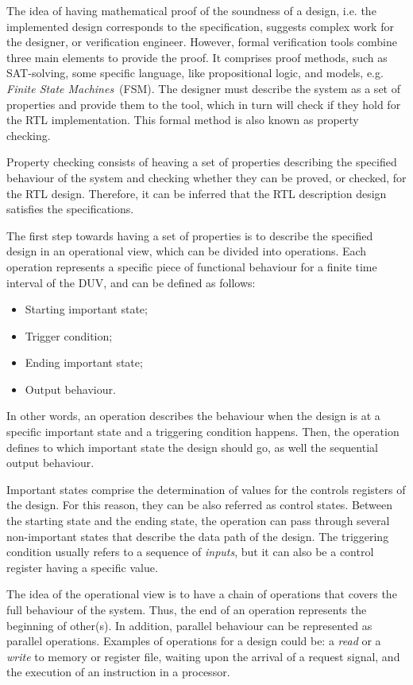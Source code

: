 The idea of having mathematical proof of the soundness of a design, i.e. the implemented design corresponds to the specification, suggests complex work for the designer, or verification engineer. However, formal verification tools combine three main elements to provide the proof. It comprises proof methods, such as SAT-solving, some specific language, like propositional logic, and models, e.g. \textit{Finite State Machines}~(FSM). The designer must describe the system as a set of properties and provide them to the tool, which in turn will check if they hold for the RTL implementation. This formal method is also known as property checking. 

Property checking consists of heaving a set of properties describing the specified behaviour of the system and checking whether they can be proved, or checked, for the RTL design.  Therefore, it can be inferred that the RTL description design satisfies the specifications. 

The first step towards having a set of properties is to describe the specified design in an operational view, which can be divided into operations. Each operation represents a specific piece of functional behaviour for a finite time interval of the DUV, and can be defined as follows:

\begin{itemize}
    \item Starting important state;
    \item Trigger condition;
    \item Ending important state;
    \item Output behaviour.
\end{itemize}

In other words, an operation describes the behaviour when the design is at a specific important state and a triggering condition happens. Then, the operation defines to which important state the design should go, as well the sequential output behaviour. 

Important states comprise the determination of values for the controls registers of the design. For this reason, they can be also referred as control states. Between the starting state and the ending state, the operation can pass through several non-important states that describe the data path of the design. The triggering condition usually refers to a sequence of \textit{inputs}, but it can also be a control register having a specific value.

The idea of the operational view is to have a chain of operations that covers the full behaviour of the system. Thus, the end of an operation represents the beginning of other(s). In addition, parallel behaviour can be represented as parallel operations. Examples of operations for a design could be: a \textit{read} or a \textit{write} to memory or register file, waiting upon the arrival of a request signal, and the execution of an instruction in a processor.

